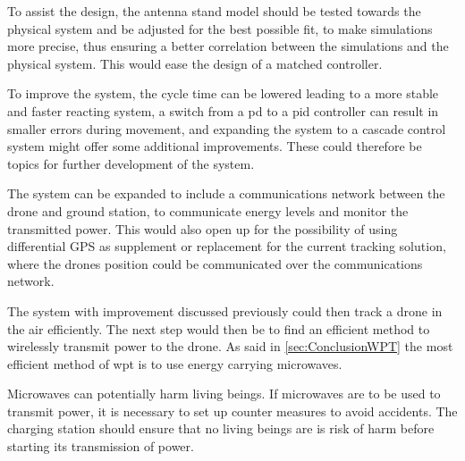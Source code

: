 To assist the design, the antenna stand model should be tested towards the physical system and be adjusted for the best possible fit, to make simulations more precise, thus ensuring a better correlation between the simulations and the physical system. This would ease the design of a matched controller.

To improve the system, the cycle time can be lowered leading to a more stable and faster reacting system, a switch from a \gls{pd} to a \gls{pid} controller can result in smaller errors during movement, and expanding the system to a cascade control system might offer some additional improvements. These could therefore be topics for further development of the system.

The system can be expanded to include a communications network between the drone and ground station, to communicate energy levels and monitor the transmitted power. This would also open up for the possibility of using differential GPS as supplement or replacement for the current tracking solution, where the drones position could be communicated over the communications network.

The system with improvement discussed previously could then track a drone in the air efficiently. The next step would then be to find an efficient method to wirelessly transmit power to the drone. As said in \autoref{sec:ConclusionWPT} the most efficient method of \gls{wpt} is to use energy carrying microwaves.

Microwaves can potentially harm living beings. If microwaves are to be used to transmit power, it is necessary to set up counter measures to avoid accidents. The charging station should ensure that no living beings are is risk of harm before starting its transmission of power. 
%




